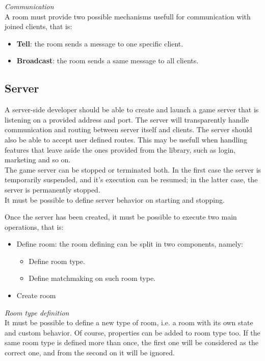 \bigskip
\textit{Communication}
\\
A room must provide two possible mechanisms usefull for communication with joined clients, that is:
\begin{itemize}
\item \textbf{Tell}: the room sends a message to one specific client.
\item \textbf{Broadcast}: the room sends a same message to all clients. 
\end{itemize} 


\subsection{Server} \label{server-requirements-gathering}

A server-side developer should be able to create and launch a game server that is listening on a provided address and port. The server will transparently handle communication and routing between server itself and clients. The server should also be able to accept user defined routes. This may be usefull when handling features that leave aside the ones provided from the library, such as login, marketing and so on.
\\
The game server can be stopped or terminated both. In the first case the server is temporarily suspended, and it's execution can be resumed; in the latter case, the server is permanently stopped.
\\
It must be possible to define server behavior on starting and stopping.

\bigskip
Once the server has been created, it must be possible to execute two main operations, that is:
\begin{itemize}
\item Define room: the room defining can be split in two components, namely:
  \begin{itemize}
  \item Define room type.
  \item Define matchmaking on such room type.
  \end{itemize}
\item Create room
\end{itemize}

\bigskip
\textit{Room type definition}
\\
It must be possible to define a new type of room, i.e. a room with its own state and custom behavior. Of course, properties can be added to room type too.
If the same room type is defined more than once, the first one will be considered as the correct one, and from the second on it will be ignored.

